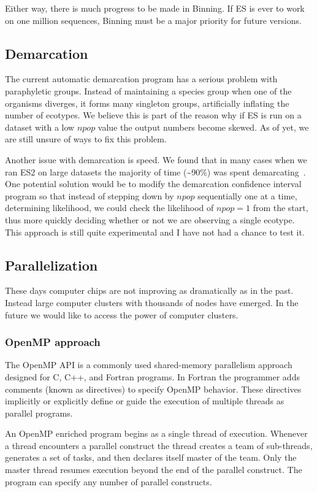 Either way, there is much progress to be made in Binning.
If ES is ever to work on one million sequences, Binning must be a major priority for future versions.

\subsection*{Demarcation}
The current automatic demarcation program has a serious problem with paraphyletic groups.
Instead of maintaining a species group when one of the organisms diverges, it forms many singleton groups, artificially inflating the number of ecotypes.
We believe this is part of the reason why if ES is run on a dataset with a low $npop$ value the output numbers become skewed.
As of yet, we are still unsure of ways to fix this problem.

Another issue with demarcation is speed.
We found that in many cases when we ran ES2 on large datasets the majority of time (\textasciitilde90\%) was spent demarcating~\cite{lingThesis}.
One potential solution would be to modify the demarcation confidence interval program so that instead of stepping down by $npop$ sequentially one at a time, determining likelihood, we could check the likelihood of $npop = 1$ from the start, thus more quickly deciding whether or not we are observing a single ecotype.
This approach is still quite experimental and I have not had a chance to test it.

\subsection*{Parallelization}
These days computer chips are not improving as dramatically as in the past.
Instead large computer clusters with thousands of nodes have emerged.
In the future we would like to access the power of computer clusters.

\subsubsection*{OpenMP approach}
The OpenMP API is a commonly used shared-memory parallelism approach designed for C, C++, and Fortran programs.
In Fortran the programmer adds comments (known as directives) to specify OpenMP behavior.
These directives implicitly or explicitly define or guide the execution of multiple threads as parallel programs.

An OpenMP enriched program begins as a single thread of execution.
Whenever a thread encounters a parallel construct the thread creates a team of sub-threads, generates a set of tasks, and then declares itself master of the team.
Only the master thread resumes execution beyond the end of the parallel construct.
The program can specify any number of parallel constructs.

